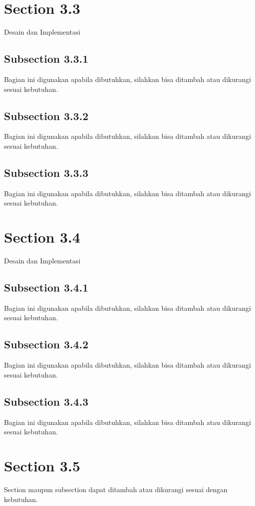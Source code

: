 \section{Section 3.3}
Desain dan Implementasi

\subsection{Subsection 3.3.1}
Bagian ini digunakan apabila dibutuhkan, silahkan bisa ditambah atau dikurangi sesuai kebutuhan.

\subsection{Subsection 3.3.2}
Bagian ini digunakan apabila dibutuhkan, silahkan bisa ditambah atau dikurangi sesuai kebutuhan.

\subsection{Subsection 3.3.3}
Bagian ini digunakan apabila dibutuhkan, silahkan bisa ditambah atau dikurangi sesuai kebutuhan.

\section{Section 3.4}
Desain dan Implementasi

\subsection{Subsection 3.4.1}
Bagian ini digunakan apabila dibutuhkan, silahkan bisa ditambah atau dikurangi sesuai kebutuhan.

\subsection{Subsection 3.4.2}
Bagian ini digunakan apabila dibutuhkan, silahkan bisa ditambah atau dikurangi sesuai kebutuhan.

\subsection{Subsection 3.4.3}
Bagian ini digunakan apabila dibutuhkan, silahkan bisa ditambah atau dikurangi sesuai kebutuhan.

\section{Section 3.5}
Section maupun subsection dapat ditambah atau dikurangi sesuai dengan kebutuhan.

